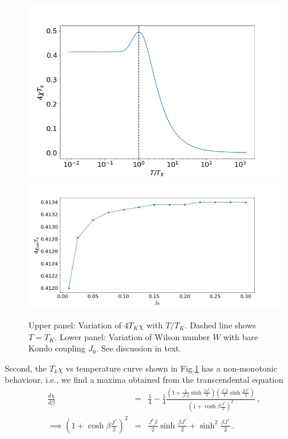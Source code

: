\documentclass[aps,prb,preprint,groupedaddress]{revtex4-2}
\begin{document}
\begin{figure}[ht!]
\begin{center}
\includegraphics[scale=0.5]{SusceptibilityVsTemp1.png}
\includegraphics[scale=0.5]{WilsonNumber.png}
\end{center}
\caption{Upper panel: Variation of $4T_{K}\chi$ with $T/T_{K}$. Dashed line shows $T=T_{K}$. Lower panel: Variation of Wilson number $W$ with bare Kondo coupling $J_{0}$. See discussion in text.}\label{suscfig1}
\end{figure}
\par\noindent
Second, the $T_{k}\chi$ vs temperature curve shown in Fig.\ref{suscfig1} has a non-monotonic behaviour, i.e., we find a maxima obtained from the transcendental equation 
\begin{eqnarray}
\frac{d\chi}{d\beta}&=&\frac{1}{4}-\frac{1}{4}\frac{(1+\frac{2}{J^{*}\beta}\sinh\frac{\beta J^{*}}{2})(\frac{J^{*}\beta}{2}\sinh\frac{\beta J^{*}}{2})}{(1+\cosh\beta\frac{J^{*}}{2})^{2}}~,\nonumber\\ 
\implies (1+\cosh\beta\frac{J^{*}}{2})^{2}&=&\frac{J^{*}\beta}{2}\sinh\frac{\beta J^{*}}{2}+\sinh^{2}\frac{\beta J^{*}}{2}~.~~~~~
\end{eqnarray} 
\end{document}
